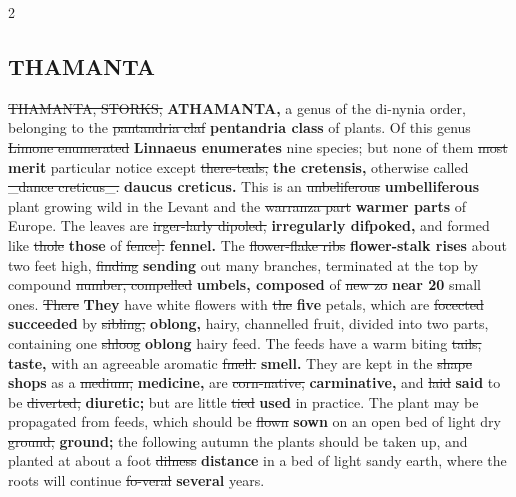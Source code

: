 \documentclass[10pt]{article}
\begin{document}
\begin{multicols}{2}
\subsection*{THAMANTA}
\sout{THAMANTA, STORKS,} \textbf{ATHAMANTA,} a genus of the di-nynia order, belonging to the \sout{pantandria claf} \textbf{pentandria class} of plants. Of this genus \sout{Limone enumerated} \textbf{Linnaeus enumerates} nine species; but none of them \sout{most} \textbf{merit} particular notice except \sout{there-teals,} \textbf{the cretensis,} otherwise called \sout{\_dance creticus\_.} \textbf{daucus creticus.} This is an \sout{unbeliferous} \textbf{umbelliferous} plant growing wild in the Levant and the \sout{warranza part} \textbf{warmer parts} of Europe. The leaves are \sout{irger-larly dipoled,} \textbf{irregularly difpoked,} and formed like \sout{thole} \textbf{those} of \sout{fence].} \textbf{fennel.} The \sout{flower-flake ribs} \textbf{flower-stalk rises} about two feet high, \sout{finding} \textbf{sending} out many branches, terminated at the top by compound \sout{number, compelled} \textbf{umbels, composed} of \sout{new zo} \textbf{near 20} small ones. \sout{There} \textbf{They} have white flowers with \sout{the} \textbf{five} petals, which are \sout{focected} \textbf{succeeded} by \sout{sibling,} \textbf{oblong,} hairy, channelled fruit, divided into two parts, containing one \sout{shloog} \textbf{oblong} hairy feed. The feeds have a warm biting \sout{tails,} \textbf{taste,} with an agreeable aromatic \sout{fmell.} \textbf{smell.} They are kept in the \sout{shape} \textbf{shops} as a \sout{medium,} \textbf{medicine,} are \sout{corn-native,} \textbf{carminative,} and \sout{laid} \textbf{said} to be \sout{diverted,} \textbf{diuretic;} but are little \sout{tied} \textbf{used} in practice. The plant may be propagated from feeds, which should be \sout{flown} \textbf{sown} on an open bed of light dry \sout{ground,} \textbf{ground;} the following autumn the plants should be taken up, and planted at about a foot \sout{dilness} \textbf{distance} in a bed of light sandy earth, where the roots will continue \sout{fo-veral} \textbf{several} years.


\end{multicols}
\end{document}
